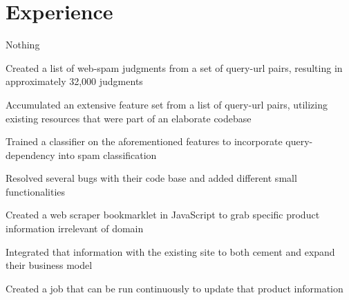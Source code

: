 \documentclass[]{deedy-resume-openfont}
\begin{document}
\hfill
\begin{minipage}[t]{0.66\textwidth} 


\section{Experience}

%
\vspace{\topsep} %
\begin{tightemize}
\item Nothing
\end{tightemize}
\sectionsep

\begin{tightemize}
\item Created a list of web-spam judgments from a set of query-url pairs, resulting in approximately 32,000 judgments
\item Accumulated an extensive feature set from a list of query-url pairs, utilizing existing resources that were part of an elaborate codebase
\item Trained a classifier on the aforementioned features to incorporate query-dependency into spam classification
\end{tightemize}
\sectionsep

\begin{tightemize}
\item Resolved several bugs with their code base and added different small functionalities
\item Created a web scraper bookmarklet in JavaScript to grab specific product information irrelevant of domain
\item Integrated that information with the existing site to both cement and expand their business model
\item Created a job that can be run continuously to update that product information
\end{tightemize}
\sectionsep



\end{minipage}
\end{document}
